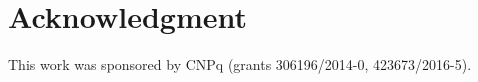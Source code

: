 \documentclass[10pt,conference]{IEEEtran}
\begin{document}
\IEEEpeerreviewmaketitle








%






\section*{Acknowledgment}
This work was sponsored by CNPq (grants
306196/2014-0, 423673/2016-5).


%
%




\end{document}
